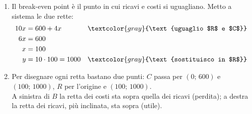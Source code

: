 \begin{question}[ID=4.1, subtitle={Break-even di una produzione di magliette}, difficulty=media, tags={sistemi, break-even, grafici}]
\begin{explanation}
\begin{enumerate}[label=\alph*),leftmargin=1.8cm]
    \[ C(x)=600+4x, \qquad R(x)=10x \]
    \item Il break-even point è il punto in cui ricavi e costi si uguagliano. Metto a sistema le due rette:
    \[\begin{aligned}
    10x &= 600+4x && \textcolor{gray}{\text{uguaglio $R$ e $C$}}\\
    6x &= 600\\
    x &= 100\\
    y &= 10\cdot100=1000 && \textcolor{gray}{\text{sostituisco in $R$}}
    \end{aligned}\]
    \item Per disegnare ogni retta bastano due punti: $C$ passa per $(0;\,600)$ e $(100;\,1000)$, $R$ per l'origine e $(100;\,1000)$. \\
    A sinistra di $B$ la retta dei costi sta sopra quella dei ricavi (perdita); a destra la retta dei ricavi, più inclinata, sta sopra (utile).
\end{enumerate}
\end{explanation}
\end{question}


